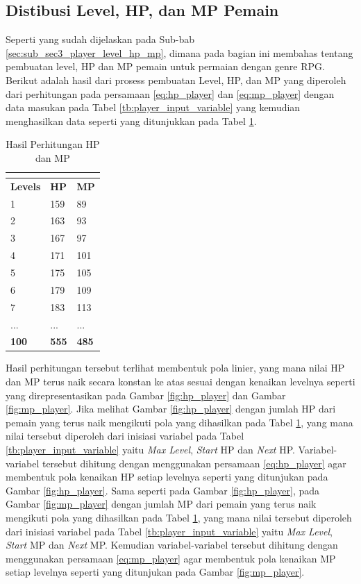 \subsection{Distibusi Level, HP, dan MP Pemain}
\label{sec:sub_sec4_eval_dist_hp_mp_level_single-character}
\vspace{1ex}

Seperti yang sudah dijelaskan pada Sub-bab \ref{sec:sub_sec3_player_level_hp_mp}, dimana pada bagian ini membahas tentang pembuatan level, HP dan MP pemain untuk permaian dengan genre RPG. Berikut adalah hasil dari prosess pembuatan Level, HP, dan MP yang diperoleh dari perhitungan pada persamaan \ref{eq:hp_player} dan \ref{eq:mp_player} dengan data masukan pada Tabel \ref{tb:player_input_variable} yang kemudian menghasilkan data seperti yang ditunjukkan pada Tabel \ref{tb:player_hp_mp}.

\begin{longtable}{|l|l|l|}
	\caption{Hasil Perhitungan HP dan MP}
	\vspace{1ex}
	\label{tb:player_hp_mp}\\
	\hline
	\rowcolor[HTML]{C0C0C0} 
	\textbf{Levels} & \textbf{HP} & \textbf{MP} \\ \hline
	1 & 159 & 89 \\ \hline
	2 & 163 & 93 \\ \hline
	3 & 167 & 97 \\ \hline
	4 & 171 & 101 \\ \hline
	5 & 175 & 105 \\ \hline
	6 & 179 & 109 \\ \hline
	7 & 183 & 113 \\ \hline
	... & ... & ... \\ \hline
	\textbf{100} & \textbf{555} & \textbf{485} \\ \hline
\end{longtable}
\vspace{1ex}

Hasil perhitungan tersebut terlihat membentuk pola linier, yang mana nilai HP dan MP terus naik secara konstan ke atas sesuai dengan kenaikan levelnya seperti yang direpresentasikan pada Gambar \ref{fig:hp_player} dan Gambar \ref{fig:mp_player}. Jika melihat Gambar \ref{fig:hp_player} dengan jumlah HP dari pemain yang terus naik mengikuti pola yang dihasilkan pada Tabel \ref{tb:player_hp_mp}, yang mana nilai tersebut diperoleh dari inisiasi variabel pada Tabel \ref{tb:player_input_variable} yaitu \textit{Max Level}, \textit{Start} HP dan \textit{Next} HP. Variabel-variabel tersebut dihitung dengan menggunakan persamaan \ref{eq:hp_player} agar membentuk pola kenaikan HP setiap levelnya seperti yang ditunjukan pada Gambar \ref{fig:hp_player}. Sama seperti pada Gambar \ref{fig:hp_player}, pada Gambar \ref{fig:mp_player} dengan jumlah MP dari pemain yang terus naik mengikuti pola yang dihasilkan pada Tabel \ref{tb:player_hp_mp}, yang mana nilai tersebut diperoleh dari inisiasi variabel pada Tabel \ref{tb:player_input_variable} yaitu \textit{Max Level}, \textit{Start} MP dan \textit{Next} MP. Kemudian variabel-variabel tersebut dihitung dengan menggunakan persamaan \ref{eq:mp_player} agar membentuk pola kenaikan MP setiap levelnya seperti yang ditunjukan pada Gambar \ref{fig:mp_player}.

